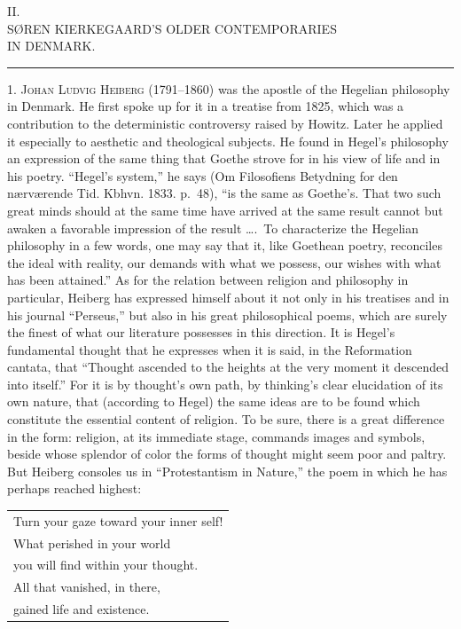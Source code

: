 \documentclass[12pt,a4paper]{book}
\newcommand{\opage}[1]{\marginnote{\footnotesize\textit{[#1]}}}
\begin{document}
\opage{16}\begin{center}II.\\[4pt] SØREN KIERKEGAARD'S OLDER CONTEMPORARIES\\ IN DENMARK.\\[4pt]\rule{1.5cm}{0.4pt}\end{center}

1. \textsc{Johan Ludvig Heiberg} (1791--1860) was the apostle of the
Hegelian philosophy in Denmark. He first spoke up for it in a treatise
from 1825, which was a contribution to the deterministic controversy
raised by Howitz. Later he applied it especially to aesthetic and
theological subjects. He found in Hegel's philosophy an expression of the
same thing that Goethe strove for in his view of life and in his poetry.
``Hegel's system,'' he says (Om Filosofiens Betydning for den
nærværende Tid. Kbhvn. 1833. p.~48), ``is the same as Goethe's. That
two such great minds should at the same time have arrived at the same
result cannot but awaken a favorable impression of the result \dots.\ To
characterize the Hegelian philosophy in a few words, one may say that it,
like Goethean poetry, reconciles the ideal with reality, our demands
with what we possess, our wishes with what has been attained.'' As for
the relation between religion and philosophy in particular, Heiberg has
expressed himself about it not only in his treatises and in his journal
``Perseus,'' but also in his great philosophical poems, which are surely
the finest of what our literature possesses
\opage{17}in this direction. It is Hegel's fundamental thought that he expresses
when it is said, in the Reformation cantata, that ``Thought ascended to
the heights at the very moment it descended into itself.'' For it is by
thought's own path, by thinking's clear elucidation of its own nature,
that (according to Hegel) the same ideas are to be found which constitute
the essential content of religion. To be sure, there is a great
difference in the form: religion, at its immediate stage, commands images
and symbols, beside whose splendor of color the forms of thought might
seem poor and paltry. But Heiberg consoles us in ``Protestantism in
Nature,'' the poem in which he has perhaps reached highest:
\begin{center}\small\begin{tabular}{@{}l@{}}
Turn your gaze toward your inner self!\\
What perished in your world\\
you will find within your thought.\\
All that vanished, in there,\\
gained life and existence.
\end{tabular}\end{center}
\end{document}
